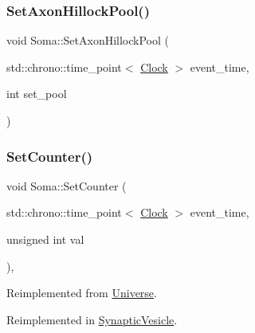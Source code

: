 \mbox{\label{classSoma_a67cdb8d00b7130b44d4ac75468f4b385}} 
\subsubsection{\texorpdfstring{Set\+Axon\+Hillock\+Pool()}{SetAxonHillockPool()}}
{\footnotesize\ttfamily void Soma\+::\+Set\+Axon\+Hillock\+Pool (\begin{DoxyParamCaption}\item[{std\+::chrono\+::time\+\_\+point$<$ \mbox{\hyperlink{universe_8h_a0ef8d951d1ca5ab3cfaf7ab4c7a6fd80}{Clock}} $>$}]{event\+\_\+time,  }\item[{int}]{set\+\_\+pool }\end{DoxyParamCaption})\hspace{0.3cm}{\ttfamily [inline]}}

\mbox{\label{classSoma_a9ef49d3fea8c0fbe6513f3910339f736}} 
\subsubsection{\texorpdfstring{Set\+Counter()}{SetCounter()}}
{\footnotesize\ttfamily void Soma\+::\+Set\+Counter (\begin{DoxyParamCaption}\item[{std\+::chrono\+::time\+\_\+point$<$ \mbox{\hyperlink{universe_8h_a0ef8d951d1ca5ab3cfaf7ab4c7a6fd80}{Clock}} $>$}]{event\+\_\+time,  }\item[{unsigned int}]{val }\end{DoxyParamCaption})\hspace{0.3cm}{\ttfamily [inline]}, {\ttfamily [virtual]}}



Reimplemented from \mbox{\hyperlink{classUniverse_aa22202ae740eb1355529afcb13285e91}{Universe}}.



Reimplemented in \mbox{\hyperlink{classSynapticVesicle_a7fd7cfce5eccb904206d968866f85220}{Synaptic\+Vesicle}}.

\mbox{\label{classSoma_a08260f4dfa8f736611fb924cfd03c4ec}} 
